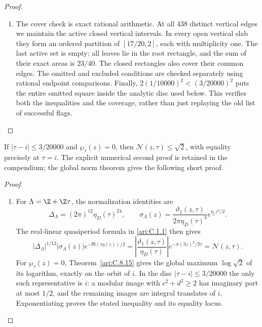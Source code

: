 \begin{proof}
\begin{enumerate}[label=\arabic*.,leftmargin=*]
\item The cover check is exact rational arithmetic. At all 438 distinct
vertical edges we maintain the active closed vertical intervals. In
every open vertical slab they form an ordered partition of
$[17/20,2]$, each with multiplicity one. The last active set is empty;
all leaves lie in the root rectangle, and the sum of their exact areas
is $23/40$. The closed rectangles also cover their common edges.
The omitted and excluded conditions are checked separately using
rational endpoint comparisons. Finally,
$2(1/10000)^2<(3/20000)^2$ puts the entire omitted square inside the
analytic disc used below. This verifies both the inequalities and
the coverage, rather than just replaying the old list of successful
flags.
\end{enumerate}

\end{proof}

\begin{theorem}\hypertarget{tag-033M}{}\label{push:src:E.4.2}

If $|\tau-i|\leq3/20000$ and $\wp_\tau(z)=0$, then
$\mathcal N(z,\tau)\leq\sqrt2$, with equality precisely at
$\tau=i$. The explicit numerical second proof is retained in the compendium;
the global norm theorem gives the following short proof.
\end{theorem}

\begin{proof}
\begin{enumerate}[label=\arabic*.,leftmargin=*]
\item For $\Lambda=\Z+\Z\tau$, the normalization identities are
\[
 \Delta_\Lambda=(2\pi)^{12}\eta_D(\tau)^{24},\qquad
 \sigma_\Lambda(z)=
 \frac{\vartheta_1(z,\tau)}{2\pi\eta_D(\tau)^3}
                 e^{\eta_1z^2/2}.
\]
The real-linear quasiperiod formula in \ref{ari:C.1.1} then gives
\[
 |\Delta_\Lambda|^{1/12}|\sigma_\Lambda(z)|
 e^{-\Re(z\eta(z))/2}
 =\left|\frac{\vartheta_1(z,\tau)}{\eta_D(\tau)}\right|
            e^{-\pi(\Im z)^2/\Im\tau}
 =\mathcal N(z,\tau).
\]
For $\wp_\tau(z)=0$, Theorem~\ref{ari:C.8.15} gives the
global maximum $\log\sqrt2$ of its logarithm, exactly on the
orbit of $i$. In the disc $|\tau-i|\le3/20000$ the only such
representative is $i$: a modular image with $c^2+d^2\ge2$
has imaginary part at most $1/2$, and the remaining images
are integral translates of $i$. Exponentiating proves the
stated inequality and its equality locus.
\end{enumerate}
\end{proof}




\clearpage\appendix

\appendix
